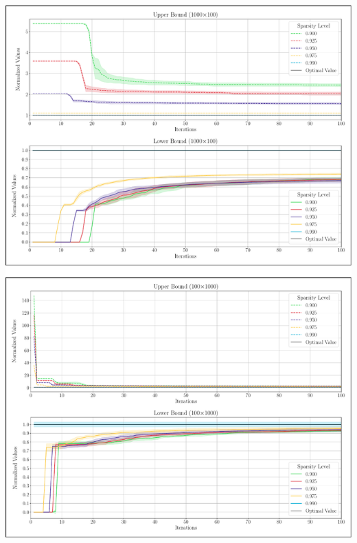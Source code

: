 \clearpage
\begin{center}
    \includegraphics[width=412pt]{assets/figures/conv_shape1.pdf}
\end{center}

